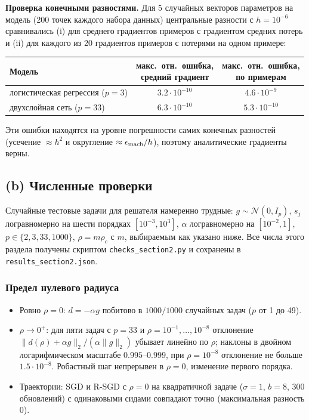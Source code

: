 \documentclass[11pt,a4paper]{article}
\newcommand{\norm}[1]{\lVert #1\rVert_2}
\begin{document}
\textbf{Проверка конечными разностями.} Для 5 случайных векторов параметров на модель
(200 точек каждого набора данных) центральные разности с $h=10^{-6}$ сравнивались (i)
для среднего градиентов примеров с градиентом средних потерь и (ii) для каждого из 20
градиентов примеров с потерями на одном примере:

\begin{center}
\begin{tabular}{@{}lcc@{}}
\toprule
Модель & \shortstack{макс.\ отн.\ ошибка,\\ средний градиент} & \shortstack{макс.\ отн.\ ошибка,\\ по примерам} \\
\midrule
логистическая регрессия ($p=3$) & $3.2\cdot10^{-10}$ & $4.6\cdot10^{-9}$ \\
двухслойная сеть ($p=33$) & $6.3\cdot10^{-10}$ & $5.3\cdot10^{-10}$ \\
\bottomrule
\end{tabular}
\end{center}
Эти ошибки находятся на уровне погрешности самих конечных разностей (усечение
$\approx h^2$ и округление $\approx\epsilon_{\rm mach}/h$), поэтому аналитические
градиенты верны.

\subsection{(b) Численные проверки}\label{sec:checks}

Случайные тестовые задачи для решателя намеренно трудные: $g\sim\mathcal N(0,I_p)$,
$s_j$ логравномерно на шести порядках $[10^{-3},10^3]$, $\alpha$ логравномерно на
$[10^{-2},1]$, $p\in\{2,3,33,1000\}$, $\rho=m\rho_c$ с $m$, выбираемым как указано
ниже. Все числа этого раздела получены скриптом \texttt{checks\_section2.py} и
сохранены в \texttt{results\_section2.json}.

\subsubsection*{Предел нулевого радиуса}
\begin{itemize}
\item Ровно $\rho=0$: $d=-\alpha g$ побитово в $1000/1000$ случайных задач ($p$ от 1
до 49).
\item $\rho\to0^+$: для пяти задач с $p=33$ и $\rho=10^{-1},\dots,10^{-8}$ отклонение
$\norm{d(\rho)+\alpha g}/(\alpha\norm g)$ убывает линейно по $\rho$; наклоны в
двойном логарифмическом масштабе $0.995$--$0.999$, при $\rho=10^{-8}$ отклонение не
больше $1.5\cdot10^{-8}$. Робастный шаг непрерывен в $\rho=0$, изменение первого
порядка.
\item Траектории: SGD и R-SGD с $\rho=0$ на квадратичной задаче ($\sigma=1$, $b=8$,
300 обновлений) с одинаковыми сидами совпадают точно (максимальная разность 0).
\end{itemize}
\end{document}
